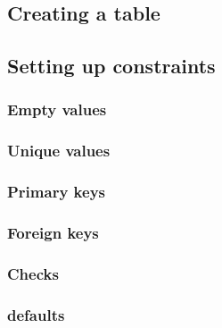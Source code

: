 \documentclass[12pt]{article} %
\begin{document}

\subsection{Creating a table} %


\subsection{Setting up constraints} %


\subsubsection{Empty values} %


\subsubsection{Unique values} %


\subsubsection{Primary keys} %


\subsubsection{Foreign keys} %


\subsubsection{Checks} %


\subsubsection{defaults} %
\end{document}
